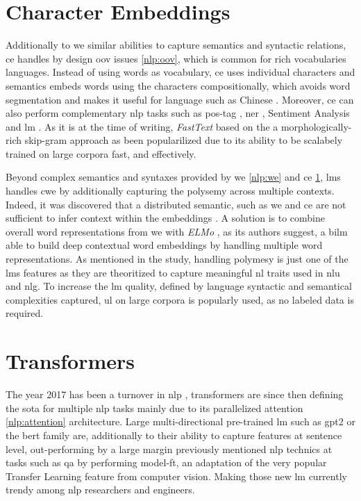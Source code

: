 \section{Character Embeddings}
\label{nlp:ce}
Additionally to \gls{we} similar abilities to capture semantics and syntactic relations, \gls{ce} handles by design \gls{oov} issues \ref{nlp:oov}, which is common for rich vocabularies languages. Instead of using words as vocabulary, \gls{ce} uses individual characters and semantics embeds words using the characters compositionally, which avoids word segmentation and makes it useful for language such as Chinese \autocite{paper:conf/ijcai/ChenXLSL15}. Moreover, \gls{ce} can also perform complementary \gls{nlp} tasks such as \gls{pos-tag} \autocite{paper:conf/icml/SantosZ14}, \gls{ner} \autocite{paper:ma-etal-2016-label}, Sentiment Analysis \autocite{paper:2017HaoYetal} and \gls{lm} \autocite{paper:journals/corr/KimJSR15}. As it is at the time of writing, \textit{FastText} based on the a morphologically-rich skip-gram approach \autocite{paper:journals/corr/BojanowskiGJM16} as been popularilized due to its ability to be scalabely trained on large corpora fast, and effectively. 


\label{nlp-lm}
Beyond complex semantics and syntaxes provided by \gls{we} \ref{nlp:we} and \gls{ce} \ref{nlp:ce}, \glspl{lm} handles \gls{cwe} by additionally capturing the polysemy across multiple contexts. Indeed, it was discovered that a distributed semantic, such as \gls{we} and \gls{ce} are not sufficient to infer context within the embeddings \autocite{paper:journals/corr/LucyG17}. A solution is to combine overall word representations from \gls{we} with \textit{ELMo} \autocite{paper:journals/corr/abs-1802-05365}, as its authors suggest, a \gls{bilm} able to build deep contextual word embeddings by handling multiple word representations. As mentioned in the study, handling polymesy is just one of the \glspl{lm} features as they are theoritized to capture meaningful \gls{nl} traits used in \gls{nlu} and \gls{nlg}. To increase the \gls{lm} quality, defined by language syntactic and semantical complexities captured, \gls{ul} on large corpora is popularly used, as no labeled data is required.


\section{Transformers}
\label{nlp:transformers}
The year 2017 has been a turnover in \gls{nlp} \autocite{paper:journals/corr/VaswaniSPUJGKP17}, transformers are since then defining the \gls{sota} for multiple \gls{nlp} tasks mainly due to its parallelized attention \ref{nlp:attention} architecture. Large multi-directional pre-trained \gls{lm} such as \gls{gpt2} or the \gls{bert} family are, additionally to their ability to capture features at sentence level, out-performing by a large margin previously mentioned \gls{nlp} technics at tasks such as \gls{qa} by performing \gls{model-ft}, an adaptation of the very popular Transfer Learning feature from computer vision. Making those new \gls{lm} currently trendy among \gls{nlp} researchers and engineers.

